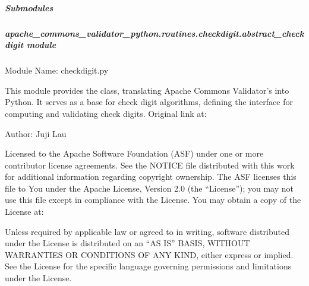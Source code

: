 \documentclass[letterpaper,10pt,english]{sphinxmanual}
\begin{document}
\subparagraph{Submodules}
\label{\detokenize{apache_commons_validator_python.routines.checkdigit:submodules}}

\subparagraph{apache\_commons\_validator\_python.routines.checkdigit.abstract\_checkdigit module}
\label{\detokenize{apache_commons_validator_python.routines.checkdigit:module-apache_commons_validator_python.routines.checkdigit.abstract_checkdigit}}\label{\detokenize{apache_commons_validator_python.routines.checkdigit:apache-commons-validator-python-routines-checkdigit-abstract-checkdigit-module}}
\sphinxAtStartPar
Module Name: checkdigit.py
\begin{description}
\sphinxAtStartPar
This module provides the  class, translating Apache Commons
Validator’s  into Python. It serves as a base for check
digit algorithms, defining the interface for computing and validating check digits.
Original link at:
\begin{quote}

\sphinxAtStartPar
{}
\end{quote}

\end{description}

\sphinxAtStartPar
Author: Juji Lau
\begin{description}
\sphinxAtStartPar
Licensed to the Apache Software Foundation (ASF) under one or more
contributor license agreements. See the NOTICE file distributed with
this work for additional information regarding copyright ownership.
The ASF licenses this file to You under the Apache License, Version 2.0
(the “License”); you may not use this file except in compliance with
the License. You may obtain a copy of the License at:
\begin{quote}

\sphinxAtStartPar
{}
\end{quote}

\sphinxAtStartPar
Unless required by applicable law or agreed to in writing, software
distributed under the License is distributed on an “AS IS” BASIS,
WITHOUT WARRANTIES OR CONDITIONS OF ANY KIND, either express or implied.
See the License for the specific language governing permissions and
limitations under the License.

\end{description}
\end{document}
